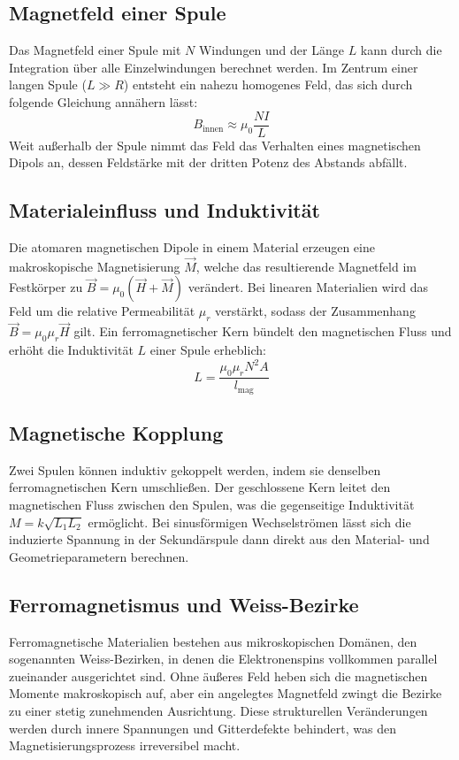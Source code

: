\documentclass[11pt,a4paper]{article}
\numberwithin{equation}{section}
\begin{document}
\subsection{Magnetfeld einer Spule}
Das Magnetfeld einer Spule mit \(N\) Windungen und der Länge \(L\) kann durch die Integration über alle Einzelwindungen berechnet werden. Im Zentrum einer langen Spule (\(L \gg R\)) entsteht ein nahezu homogenes Feld, das sich durch folgende Gleichung annähern lässt:
\begin{equation}
    B_{\text{innen}} \approx \mu_0 \frac{N I}{L}
\end{equation}
Weit außerhalb der Spule nimmt das Feld das Verhalten eines magnetischen Dipols an, dessen Feldstärke mit der dritten Potenz des Abstands abfällt.

\subsection{Materialeinfluss und Induktivität}
Die atomaren magnetischen Dipole in einem Material erzeugen eine makroskopische Magnetisierung \(\vec{M}\), welche das resultierende Magnetfeld im Festkörper zu \(\vec{B} = \mu_0 (\vec{H} + \vec{M})\) verändert. Bei linearen Materialien wird das Feld um die relative Permeabilität \(\mu_r\) verstärkt, sodass der Zusammenhang \(\vec{B} = \mu_0 \mu_r \vec{H}\) gilt. Ein ferromagnetischer Kern bündelt den magnetischen Fluss und erhöht die Induktivität \(L\) einer Spule erheblich:
\begin{equation}
    L = \frac{\mu_0 \mu_r N^2 A}{l_{\text{mag}}}
\end{equation}

\subsection{Magnetische Kopplung}
Zwei Spulen können induktiv gekoppelt werden, indem sie denselben ferromagnetischen Kern umschließen. Der geschlossene Kern leitet den magnetischen Fluss zwischen den Spulen, was die gegenseitige Induktivität \(M = k \sqrt{L_1 L_2}\) ermöglicht. Bei sinusförmigen Wechselströmen lässt sich die induzierte Spannung in der Sekundärspule dann direkt aus den Material- und Geometrieparametern berechnen.

\subsection{Ferromagnetismus und Weiss-Bezirke}
Ferromagnetische Materialien bestehen aus mikroskopischen Domänen, den sogenannten Weiss-Bezirken, in denen die Elektronenspins vollkommen parallel zueinander ausgerichtet sind. Ohne äußeres Feld heben sich die magnetischen Momente makroskopisch auf, aber ein angelegtes Magnetfeld zwingt die Bezirke zu einer stetig zunehmenden Ausrichtung. Diese strukturellen Veränderungen werden durch innere Spannungen und Gitterdefekte behindert, was den Magnetisierungsprozess irreversibel macht.
\end{document}
